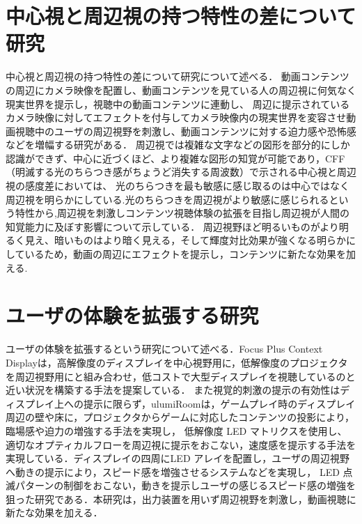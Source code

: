 \section{中心視と周辺視の持つ特性の差について研究}
中心視と周辺視の持つ特性の差について研究について述べる．
動画コンテンツの周辺にカメラ映像を配置し、動画コンテンツを見ている人の周辺視に何気なく現実世界を提示し，視聴中の動画コンテンツに連動し、
周辺に提示されているカメラ映像に対してエフェクトを付与してカメラ映像内の現実世界を変容させ動画視聴中のユーザの周辺視野を刺激し、動画コンテンツに対する迫力感や恐怖感などを増幅する研究がある\cite{shamo4}．
周辺視では複雑な文字などの図形を部分的にしか認識ができず、中心に近づくほど、より複雑な図形の知覚が可能であり\cite{shamo5}，CFF （明滅する光のちらつき感がちょうど消失する周波数）で示される中心視と周辺視の感度差においては、
光のちらつきを最も敏感に感じ取るのは中心ではなく周辺視を明らかにしている\cite{shamo6}.光のちらつきを周辺視がより敏感に感じられるという特性から,周辺視を刺激しコンテンツ視聴体験の拡張を目指し周辺視が人間の知覚能力に及ぼす影響について示している\cite{shamo7}．
周辺視野ほど明るいものがより明るく見え、暗いものはより暗く見える，そして輝度対比効果が強くなる明らかにしているため\cite{shamo8}，動画の周辺にエフェクトを提示し，コンテンツに新たな効果を加える.

\section{ユーザの体験を拡張する研究}
ユーザの体験を拡張するという研究について述べる．Focus Plus Context Displayは，高解像度のディスプレイを中心視野用に，低解像度のプロジェクタを周辺視野用にと組み合わせ，低コストで大型ディスプレイを視聴しているのと近い状況を構築する手法を提案している\cite{shamo9}．
また視覚的刺激の提示の有効性はディスプレイ上への提示に限らず，ulumiRoomは，ゲームプレイ時のディスプレイ周辺の壁や床に，プロジェクタからゲームに対応したコンテンツの投影により，臨場感や迫力の増強する手法を実現し\cite{shamo10}，
低解像度 LED マトリクスを使用し、適切なオプティカルフローを周辺視に提示をおこない，速度感を提示する手法を実現している\cite{shamo11}．ディスプレイの四周にLED アレイを配置し，ユーザの周辺視野へ動きの提示により，スピード感を増強させるシステムなどを実現し，
LED 点滅パターンの制御をおこない，動きを提示しユーザの感じるスピード感の増強を狙った研究である\cite{shamo12}．本研究は，出力装置を用いず周辺視野を刺激し，動画視聴に新たな効果を加える．
